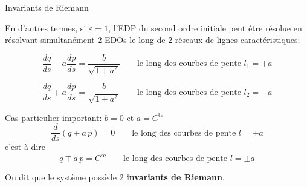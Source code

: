 \documentclass[
mode=present,    %
paper=a4paper,   %
orient=landscape,
display=slides,   %
size=10pt,
style=romain   %
]{powerdot}
\begin{document}
\begin{slide}[toc=Inv. de Riemann]{Invariants de Riemann}

En d'autres termes, si $\varepsilon=1$, l'EDP du second ordre initiale peut être résolue en résolvant simultanément 2 EDOs le long de 2 réseaux de lignes caractéristiques:

        \begin{equation*}
\frac{dq}{ds} - a \frac{dp}{ds} = \frac{b}{\sqrt{1+a^2}}  \qquad\text{le long des courbes de pente } l_1=+a
        \end{equation*}

        \begin{equation*}
\frac{dq}{ds} + a \frac{dp}{ds} = \frac{b}{\sqrt{1+a^2}}  \qquad\text{le long des courbes de pente } l_2=-a
        \end{equation*}

\bigskip

Cas particulier important: $b=0$ et $a=C^{\text{te}}$
        \begin{equation*}
\frac{d}{ds} (q\mp a\,p)  = 0  \qquad\text{le long des courbes de pente } l=\pm a
        \end{equation*}
c'est-à-dire
        \begin{equation*}
q\mp a\,p = C^{\text{te}}  \qquad\text{le long des courbes de pente } l=\pm a
        \end{equation*}

On dit que le système possède 2 \textbf{invariants de Riemann}.

\end{slide}
\end{document}
